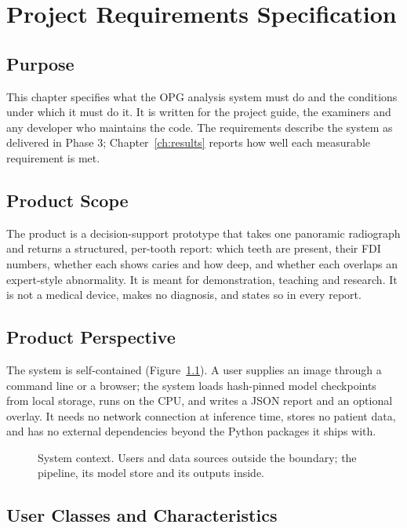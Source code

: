 \chapter{Project Requirements Specification}
\label{ch:prs}

\section{Purpose}

This chapter specifies what the OPG analysis system must do and the conditions under which it must
do it. It is written for the project guide, the examiners and any developer who maintains the code.
The requirements describe the system as delivered in Phase 3; Chapter~\ref{ch:results} reports how
well each measurable requirement is met.

\section{Product Scope}

The product is a decision-support prototype that takes one panoramic radiograph and returns a
structured, per-tooth report: which teeth are present, their FDI numbers, whether each shows caries
and how deep, and whether each overlaps an expert-style abnormality. It is meant for demonstration,
teaching and research. It is not a medical device, makes no diagnosis, and states so in every report.

\section{Product Perspective}

The system is self-contained (Figure~\ref{fig:context}). A user supplies an image through a command
line or a browser; the system loads hash-pinned model checkpoints from local storage, runs on the
CPU, and writes a JSON report and an optional overlay. It needs no network connection at inference
time, stores no patient data, and has no external dependencies beyond the Python packages it ships
with.

\begin{figure}[!htbp]
\centering

\caption[System context diagram]{System context. Users and data sources outside the boundary; the
pipeline, its model store and its outputs inside.}
\label{fig:context}
\end{figure}

\section{User Classes and Characteristics}


